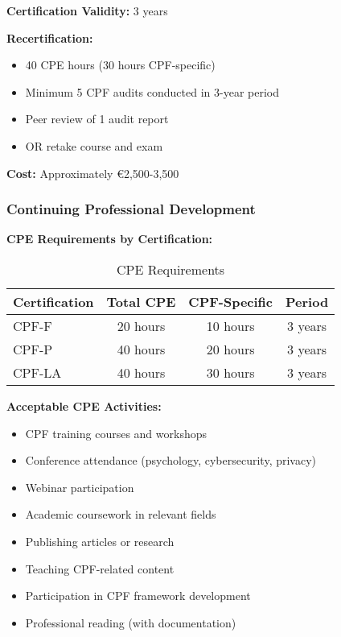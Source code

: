 \documentclass[11pt,a4paper]{article}
\begin{document}
\textbf{Certification Validity:} 3 years

\textbf{Recertification:} 
\begin{itemize}
\item 40 CPE hours (30 hours CPF-specific)
\item Minimum 5 CPF audits conducted in 3-year period
\item Peer review of 1 audit report
\item OR retake course and exam
\end{itemize}

\textbf{Cost:} Approximately €2,500-3,500

\subsubsection{Continuing Professional Development}

\textbf{CPE Requirements by Certification:}

\begin{table}[h]
\centering
\caption{CPE Requirements}
\begin{tabular}{lccc}
\toprule
\textbf{Certification} & \textbf{Total CPE} & \textbf{CPF-Specific} & \textbf{Period} \\
\midrule
CPF-F & 20 hours & 10 hours & 3 years \\
CPF-P & 40 hours & 20 hours & 3 years \\
CPF-LA & 40 hours & 30 hours & 3 years \\
\bottomrule
\end{tabular}
\end{table}

\textbf{Acceptable CPE Activities:}

\begin{itemize}
\item CPF training courses and workshops
\item Conference attendance (psychology, cybersecurity, privacy)
\item Webinar participation
\item Academic coursework in relevant fields
\item Publishing articles or research
\item Teaching CPF-related content
\item Participation in CPF framework development
\item Professional reading (with documentation)
\end{itemize}
\end{document}
